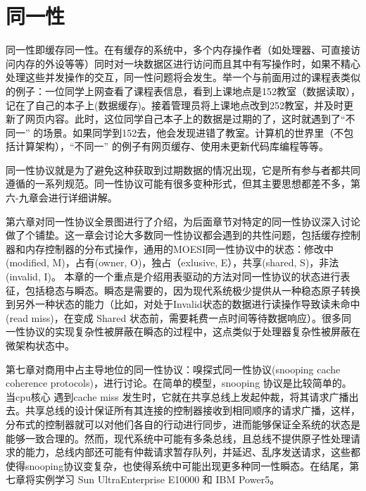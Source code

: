 \documentclass[UTF-8]{ctexrep}
\begin{document}
\section{同一性}
\par 同一性即缓存同一性。在有缓存的系统中，多个内存操作者（如处理器、可直接访问内存的外设等等）同时对一块数据区进行访问而且其中有写操作时，如果不精心处理这些并发操作的交互，同一性问题将会发生。举一个与前面用过的课程表类似的例子：一位同学上网查看了课程表信息，看到上课地点是152教室（数据读取），记在了自己的本子上(数据缓存)。接着管理员将上课地点改到252教室，并及时更新了网页内容。此时，这位同学自己本子上的数据是过期的了，这时就遇到了“不同一” 的场景。如果同学到152去，他会发现进错了教室。计算机的世界里（不包括计算架构），“不同一” 的例子有网页缓存、使用未更新代码库编程等等。
\par 同一性协议就是为了避免这种获取到过期数据的情况出现，它是所有参与者都共同遵循的一系列规范。同一性协议可能有很多变种形式，但其主要思想都差不多，第六-九章会进行详细讲解。
\par 第六章对同一性协议全景图进行了介绍，为后面章节对特定的同一性协议深入讨论做了个铺垫。这一章会讨论大多数同一性协议都会遇到的共性问题，包括缓存控制器和内存控制器的分布式操作，通用的MOESI同一性协议中的状态：修改中(modified, M)，占有(owner, O)，独占（exlusive, E），共享(shared, S)，非法(invalid, I)。 本章的一个重点是介绍用表驱动的方法对同一性协议的状态进行表征，包括稳态与瞬态。瞬态是需要的，因为现代系统极少提供从一种稳态原子转换到另外一种状态的能力（比如，对处于Invalid状态的数据进行读操作导致读未命中(read miss)，在变成 Shared 状态前，需要耗费一点时间等待数据响应）。很多同一性协议的实现复杂性被屏蔽在瞬态的过程中，这点类似于处理器复杂性被屏蔽在微架构状态中。
\par 第七章对商用中占主导地位的同一性协议：嗅探式同一性协议(snooping cache coherence protocols)，进行讨论。在简单的模型，snooping 协议是比较简单的。当cpu核心 遇到cache miss 发生时，它就在共享总线上发起仲裁，将其请求广播出去。共享总线的设计保证所有其连接的控制器接收到相同顺序的请求广播，这样，分布式的控制器就可以对他们各自的行动进行同步，进而能够保证全系统的状态是能够一致合理的。然而，现代系统中可能有多条总线，且总线不提供原子性处理请求的能力，总线内部还可能有仲裁请求暂存队列，并延迟、乱序发送请求，这些都使得snooping协议变复杂，也使得系统中可能出现更多种同一性瞬态。在结尾，第七章将实例学习 Sun UltraEnterprise E10000 和 IBM Power5。
\end{document}
